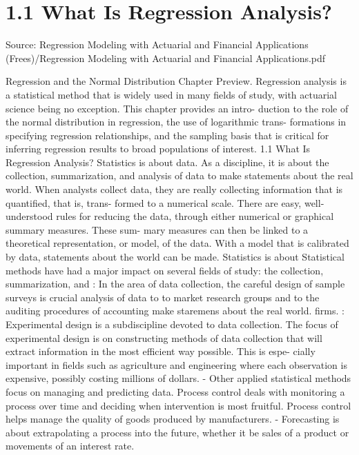\documentclass[11pt]{article}
\begin{document}
\section*{1.1 What Is Regression Analysis?}
{\small Source: Regression Modeling with Actuarial and Financial Applications (Frees)/Regression Modeling with Actuarial and Financial Applications.pdf\par}
 Regression and the Normal Distribution
Chapter Preview. Regression analysis is a statistical method that is widely used in many
fields of study, with actuarial science being no exception. This chapter provides an intro-
 duction to the role of the normal distribution in regression, the use of logarithmic trans-
formations in specifying regression relationships, and the sampling basis that is critical
for inferring regression results to broad populations of interest.
1.1 What Is Regression Analysis?
Statistics is about data. As a discipline, it is about the collection, summarization,
and analysis of data to make statements about the real world. When analysts
 collect data, they are really collecting information that is quantified, that is, trans-
 formed to a numerical scale. There are easy, well-understood rules for reducing
 the data, through either numerical or graphical summary measures. These sum-
mary measures can then be linked to a theoretical representation, or model, of
the data. With a model that is calibrated by data, statements about the world can
 be made. Statistics is about
 Statistical methods have had a major impact on several fields of study: the collection,
 summarization, and
: In the area of data collection, the careful design of sample surveys is crucial analysis of data to
to market research groups and to the auditing procedures of accounting  make staremens
 about the real world.
firms.
: Experimental design is a subdiscipline devoted to data collection. The focus
of experimental design is on constructing methods of data collection that
will extract information in the most efficient way possible. This is espe-
cially important in fields such as agriculture and engineering where each
observation is expensive, possibly costing millions of dollars.
- Other applied statistical methods focus on managing and predicting data.
Process control deals with monitoring a process over time and deciding
 when intervention is most fruitful. Process control helps manage the quality
 of goods produced by manufacturers.
- Forecasting is about extrapolating a process into the future, whether it be
 sales of a product or movements of an interest rate.
\end{document}
